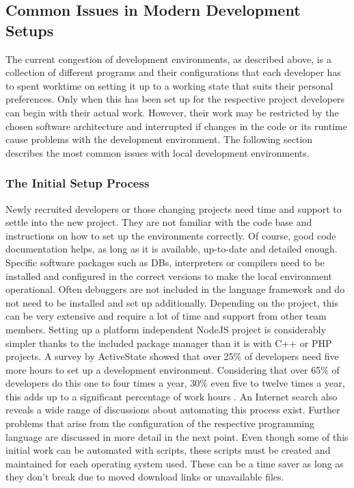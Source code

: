 \documentclass[12pt, a4paper]{article}
\begin{document}
    \subsection{Common Issues in Modern Development Setups}
    The current congestion of development environments, as described above, is a collection of different programs and their configurations that each developer has to spent worktime on setting it up to a working state that suits their personal preferences. Only when this has been set up for the respective project developers can begin with their actual work. However, their work may be restricted by the chosen software architecture and interrupted if changes in the code or its runtime cause problems with the development environment. The following section describes the most common issues with local development environments.

        \subsubsection{The Initial Setup Process}\label{sss::initial}
        Newly recruited developers or those changing projects need time and support to settle into the new project. They are not familiar with the code base and instructions on how to set up the environments correctly. Of course, good code documentation helps, as long as it is available, up-to-date and detailed enough. Specific software packages such as \ac{DB}s, interpreters or compilers need to be installed and configured in the correct versions to make the local environment operational. Often debuggers are not included in the language framework and do not need to be installed and set up additionally. Depending on the project, this can be very extensive and require a lot of time and support from other team members. Setting up a platform independent NodeJS project is considerably simpler thanks to the included package manager  than it is with C++ or PHP projects. A survey by ActiveState showed that over 25\% of developers need five more hours to set up a development environment. Considering that over 65\% of developers do this one to four times a year, 30\% even five to twelve times a year, this adds up to a significant percentage of work hours \cite{setuppain}. An Internet search also reveals a wide range of discussions about automating this process exist. Further problems that arise from the configuration of the respective programming language are discussed in more detail in the next point. \newline
        Even though some of this initial work can be automated with scripts, these scripts must be created and maintained for each operating system used. These can be a time saver as long as they don't break due to moved download links or unavailable files.
\end{document}
